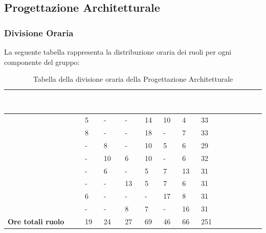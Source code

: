 \subsection{Progettazione Architetturale}

\subsubsection{Divisione Oraria}
La seguente tabella rappresenta la distribuzione oraria dei ruoli per ogni componente del gruppo:
{
\renewcommand{\arraystretch}{2}
\begin{longtable}[h!] { C{4cm} C{1cm} C{1cm} C{1cm} C{1cm} C{1cm} C{1cm} C{3cm}}
\caption{Tabella della divisione oraria della Progettazione Architetturale}\\

\textcolor{white}{\textbf{Membro del gruppo}} & 
\textcolor{white}{\textbf{RE}} & 
\textcolor{white}{\textbf{AM}} & 
\textcolor{white}{\textbf{AN}} & 
\textcolor{white}{\textbf{PT}} & 
\textcolor{white}{\textbf{PR}} & 
\textcolor{white}{\textbf{VE}} & 
\textcolor{white}{\textbf{Ore complessive}}\\	
\endhead
        
\MC{}                     &  5 &  - &  - & 14 & 10 &  4 &  33 \\
\LD{}                     &  8 &  - &  - & 18 &  - &  7 &  33 \\
\CE{}                     &  - &  8 &  - & 10 &  5 &  6 &  29 \\
\SE{}                     &  - & 10 &  6 & 10 &  - &  6 &  32 \\
\PF{}                     &  - &  6 &  - &  5 &  7 & 13 &  31 \\
\DF{}                     &  - &  - & 13 &  5 &  7 &  6 &  31 \\
\BR{}                     &  6 &  - &  - &  - & 17 &  8 &  31 \\
\AT{}                     &  - &  - &  8 &  7 &  - & 16 &  31 \\
\textbf{Ore totali ruolo} & 19 & 24 & 27 & 69 & 46 & 66 & 251 \\
		
\end{longtable}
}

